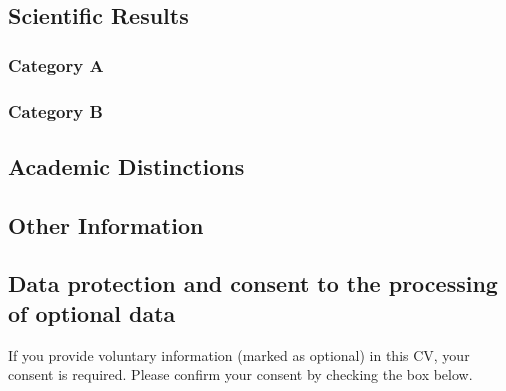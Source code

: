 \documentclass{scrartcl}
\begin{document}
\subsection*{Scientific Results}
\nocite{*}

\subsubsection*{Category A}
\printbibliography[category=reviewed, heading=none]

\subsubsection*{Category B}
\printbibliography[category=nonreviewed, heading=none, resetnumbers=true]

\subsection*{Academic Distinctions}

\subsection*{Other Information}

\subsection*{Data protection and consent to the processing of optional data}

If you provide voluntary information (marked as optional) in this CV, your consent is required.
Please confirm your consent by checking the box below.
\end{document}
